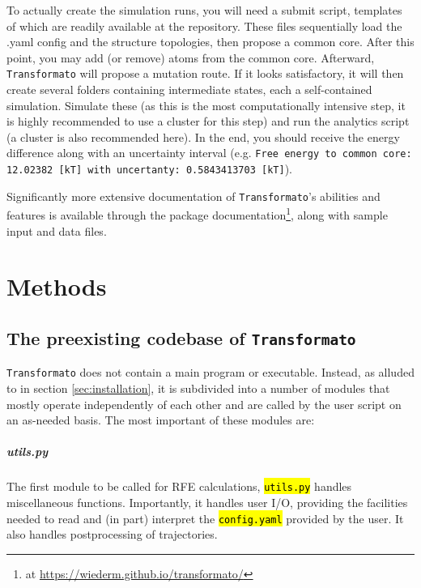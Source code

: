 \documentclass[oneside]{scrreprt}
\newcommand{\code}[1]{\texttt{\hl{#1}}}
\begin{document}
To actually create the simulation runs, you will need a submit script, templates of which are readily available at the repository. These files sequentially load the .yaml config and the structure topologies, then propose a common core. After this point, you may add (or remove) atoms from the common core. Afterward, \texttt{Transformato} will propose a mutation route. If it looks satisfactory, it will then create several folders containing intermediate states, each a self-contained simulation. Simulate these (as this is the most computationally intensive step, it is highly recommended to use a cluster for this step) and run the analytics script (a cluster is also recommended here). In the end, you should receive the energy difference along with an uncertainty interval (e.g. \texttt{Free energy to common core: 12.02382 [kT] with uncertanty: 0.5843413703 [kT]}).
    

Significantly more extensive documentation of \texttt{Transformato}'s abilities and features is available through the package documentation\footnote{at \url{https://wiederm.github.io/transformato/}}, along with sample input and data files.


\chapter{Methods}
\section{The preexisting codebase of \texttt{Transformato}}
\texttt{Transformato} does not contain a main program or executable. Instead, as alluded to in section \ref{sec:installation}, it is subdivided into a number of modules that mostly operate independently of each other and are called by the user script on an as-needed basis. The most important of these modules are:
\paragraph{utils.py}
The first module to be called for RFE calculations, \code{utils.py} handles miscellaneous functions. Importantly, it handles user I/O, providing the facilities needed to read and (in part) interpret the \code{config.yaml} provided by the user. It also handles postprocessing of trajectories.
\end{document}
